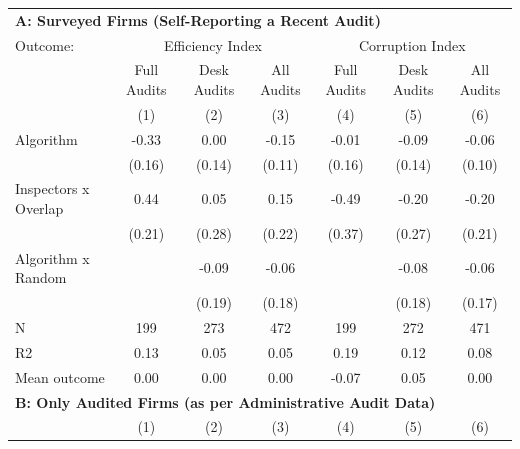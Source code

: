 \begin{tabular}{lccc|ccc} \toprule
\multicolumn{7}{l}{\textbf{A: Surveyed Firms (Self-Reporting a Recent Audit)}} \\ \multicolumn{1}{l}{Outcome:} & \multicolumn{3}{c}{Efficiency Index} & \multicolumn{3}{c}{Corruption Index} \\ \multicolumn{1}{l}{} & Full Audits & Desk Audits & All Audits & Full Audits & Desk Audits & All Audits \\ \multicolumn{1}{l}{} & (1) & (2) & (3) & (4) & (5) & (6) \\ \midrule
Algorithm   &       -0.33\sym{**} &        0.00         &       -0.15         &       -0.01         &       -0.09         &       -0.06         \\
            &      (0.16)         &      (0.14)         &      (0.11)         &      (0.16)         &      (0.14)         &      (0.10)         \\
\addlinespace
Inspectors x Overlap&        0.44\sym{**} &        0.05         &        0.15         &       -0.49         &       -0.20         &       -0.20         \\
            &      (0.21)         &      (0.28)         &      (0.22)         &      (0.37)         &      (0.27)         &      (0.21)         \\
\addlinespace
Algorithm x Random&                     &       -0.09         &       -0.06         &                     &       -0.08         &       -0.06         \\
            &                     &      (0.19)         &      (0.18)         &                     &      (0.18)         &      (0.17)         \\
\midrule
N           &         199         &         273         &         472         &         199         &         272         &         471         \\
R2          &        0.13         &        0.05         &        0.05         &        0.19         &        0.12         &        0.08         \\
Mean outcome&        0.00         &        0.00         &        0.00         &       -0.07         &        0.05         &        0.00         \\

\midrule \multicolumn{7}{l}{\textbf{B: Only Audited Firms (as per Administrative Audit Data)}} \\ \multicolumn{1}{l}{} & (1) & (2) & (3) & (4) & (5) & (6) \\ \midrule


\end{tabular}
